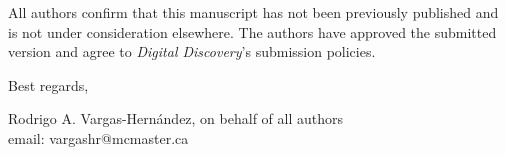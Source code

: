 \documentclass{article}
\begin{document}
All authors confirm that this manuscript has not been previously published and is not under consideration elsewhere. The authors have approved the submitted version and agree to \emph{Digital Discovery}'s submission policies.

\vspace{0.5cm}

Best regards,\vspace{0.5cm}\\
\begin{center}
Rodrigo A. Vargas-Hern\'{a}ndez, on behalf of all authors \\
email: vargashr@mcmaster.ca
\end{center}
\end{document}
